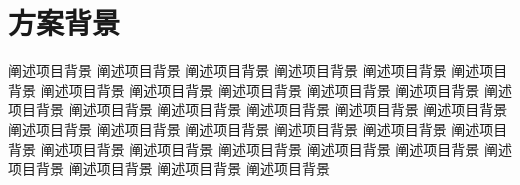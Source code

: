 \newpage
\section{方案背景}

\songti\text
阐述项目背景 阐述项目背景 阐述项目背景 阐述项目背景 阐述项目背景 阐述项目背景 阐述项目背景 阐述项目背景 阐述项目背景 阐述项目背景 阐述项目背景 阐述项目背景 阐述项目背景 阐述项目背景 阐述项目背景 阐述项目背景 阐述项目背景 阐述项目背景 阐述项目背景 阐述项目背景 阐述项目背景 阐述项目背景 阐述项目背景 阐述项目背景 阐述项目背景 阐述项目背景 阐述项目背景 阐述项目背景 阐述项目背景 阐述项目背景 阐述项目背景 阐述项目背景
